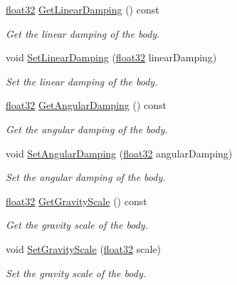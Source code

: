 \begin{DoxyCompactItemize}
\item 
\mbox{\hyperlink{b2_settings_8h_aacdc525d6f7bddb3ae95d5c311bd06a1}{float32}} \mbox{\hyperlink{classb2_body_aff6bc518ea0f07fa5bba7cb7782e86d1}{Get\+Linear\+Damping}} () const
\begin{DoxyCompactList}\small\item\em Get the linear damping of the body. \end{DoxyCompactList}\item 
void \mbox{\hyperlink{classb2_body_a909f9753ad700f70282a56e00bc182a5}{Set\+Linear\+Damping}} (\mbox{\hyperlink{b2_settings_8h_aacdc525d6f7bddb3ae95d5c311bd06a1}{float32}} linear\+Damping)
\begin{DoxyCompactList}\small\item\em Set the linear damping of the body. \end{DoxyCompactList}\item 
\mbox{\hyperlink{b2_settings_8h_aacdc525d6f7bddb3ae95d5c311bd06a1}{float32}} \mbox{\hyperlink{classb2_body_a151f5e81e44037883f61b67821704999}{Get\+Angular\+Damping}} () const
\begin{DoxyCompactList}\small\item\em Get the angular damping of the body. \end{DoxyCompactList}\item 
void \mbox{\hyperlink{classb2_body_a73a79541b18394fa224d2eae8ad493e8}{Set\+Angular\+Damping}} (\mbox{\hyperlink{b2_settings_8h_aacdc525d6f7bddb3ae95d5c311bd06a1}{float32}} angular\+Damping)
\begin{DoxyCompactList}\small\item\em Set the angular damping of the body. \end{DoxyCompactList}\item 
\mbox{\hyperlink{b2_settings_8h_aacdc525d6f7bddb3ae95d5c311bd06a1}{float32}} \mbox{\hyperlink{classb2_body_aa570b2310248b4b3bd776836e839bc45}{Get\+Gravity\+Scale}} () const
\begin{DoxyCompactList}\small\item\em Get the gravity scale of the body. \end{DoxyCompactList}\item 
void \mbox{\hyperlink{classb2_body_a8e66a570c2aeee93b29d84cae861a612}{Set\+Gravity\+Scale}} (\mbox{\hyperlink{b2_settings_8h_aacdc525d6f7bddb3ae95d5c311bd06a1}{float32}} scale)
\begin{DoxyCompactList}\small\item\em Set the gravity scale of the body. \end{DoxyCompactList}\item 

\end{DoxyCompactItemize}
